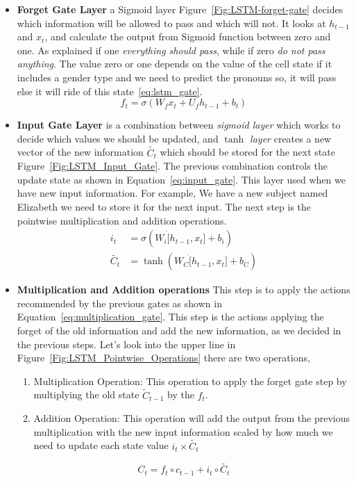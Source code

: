 \begin{itemize}
  
\item \textbf{Forget Gate Layer} a Sigmoid layer Figure~\ref{Fig:LSTM-forget-gate} decides which information will be allowed to pass and which will not. It looks at $h_{t-1}$ and $x_t$, and calculate the output from Sigmoid function between zero and one. As explained if one \textit{everything should pass}, while if zero \textit{do not pass anything}. The value zero or one depends on the value of the cell state if it includes a gender type and we need to predict the pronouns so, it will pass else it will ride of this state~\eqref{eq:lstm_gate}.%
\begin{equation}\label{eq:lstm_gate}
f_t  = \sigma(W_f  x_t + U_f h_{t-1} + b_t)
\end{equation}%

\item \textbf{Input Gate Layer} is a combination between \textit{sigmoid layer} which works to decide which values we should be updated, and \textit{$\tanh$ layer} creates a new vector of the new information $\tilde{C_t}$ which should be stored for the next state Figure~\ref{Fig:LSTM_Input_Gate}. The previous combination controls the update state as shown in Equation~\eqref{eq:input_gate}. This layer used when we have new input information. For example, We have a new subject named Elizabeth we need to store it for the next input. The next step is the pointwise multiplication and addition operations.%
\begin{subequations}\label{eq:input_gate}
\begin{align}
  i_t  &= \sigma(W_i \dot[h_{t-1},x_t] + b_i)\\
\widetilde{C_t} &= \tanh(W_C\dot [h_{t-1},x_t]+ b_C)
\end{align}
\end{subequations}

\item \textbf{Multiplication and Addition operations} This step is to apply the actions recommended by the previous gates as shown in Equation~\eqref{eq:multiplication_gate}. This step is the actions applying the forget of the old information and add the new information, as we decided in the previous steps. Let's look into the upper line in Figure~\ref{Fig:LSTM_Pointwise_Operations} there are two operations, 
  \begin{enumerate}
  \item Multiplication Operation: This operation to apply the forget gate step by multiplying the old state $\tilde{C}_{t-1} $ by the $f_t$.
  \item Addition Operation: This operation will add the output from the previous multiplication with the new input information scaled by how much we need to update each state value $i_t \times \tilde{C_t}$
    \end{enumerate}%
\begin{equation}\label{eq:multiplication_gate}
C_t  = f_t \circ c_{t-1} + i_t \circ \widetilde{C_t}
\end{equation}
      

\end{itemize}

